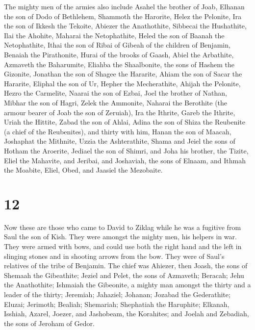  The mighty men of the armies also include Asahel the
brother of Joab, Elhanan the son of Dodo of Bethlehem, 
Shammoth the Harorite, Helez the Pelonite,  Ira the son
of Ikkesh the Tekoite, Abiezer the Anathothite,  Sibbecai
the Hushathite, Ilai the Ahohite,  Maharai the
Netophathite, Heled the son of Baanah the Netophathite, 
Ithai the son of Ribai of Gibeah of the children of Benjamin, Benaiah
the Pirathonite,  Hurai of the brooks of Gaash, Abiel the
Arbathite,  Azmaveth the Baharumite, Eliahba the
Shaalbonite,  the sons of Hashem the Gizonite, Jonathan
the son of Shagee the Hararite,  Ahiam the son of Sacar
the Hararite, Eliphal the son of Ur,  Hepher the
Mecherathite, Ahijah the Pelonite,  Hezro the Carmelite,
Naarai the son of Ezbai,  Joel the brother of Nathan,
Mibhar the son of Hagri,  Zelek the Ammonite, Naharai the
Berothite (the armour bearer of Joab the son of Zeruiah),
 Ira the Ithrite, Gareb the Ithrite, 
Uriah the Hittite, Zabad the son of Ahlai,  Adina the son
of Shiza the Reubenite (a chief of the Reubenites), and thirty with him,
 Hanan the son of Maacah, Joshaphat the Mithnite,
 Uzzia the Ashterathite, Shama and Jeiel the sons of
Hotham the Aroerite,  Jediael the son of Shimri, and Joha
his brother, the Tizite,  Eliel the Mahavite, and
Jeribai, and Joshaviah, the sons of Elnaam, and Ithmah the Moabite,
 Eliel, Obed, and Jaasiel the Mezobaite.

\hypertarget{section-11}{%
\section{12}\label{section-11}}

 Now these are those who came to David to Ziklag while he
was a fugitive from Saul the son of Kish. They were amongst the mighty
men, his helpers in war.  They were armed with bows, and
could use both the right hand and the left in slinging stones and in
shooting arrows from the bow. They were of Saul's relatives of the tribe
of Benjamin.  The chief was Ahiezer, then Joash, the sons
of Shemaah the Gibeathite; Jeziel and Pelet, the sons of Azmaveth;
Beracah; Jehu the Anathothite;  Ishmaiah the Gibeonite, a
mighty man amongst the thirty and a leader of the thirty; Jeremiah;
Jahaziel; Johanan; Jozabad the Gederathite;  Eluzai;
Jerimoth; Bealiah; Shemariah; Shephatiah the Haruphite; 
Elkanah, Isshiah, Azarel, Joezer, and Jashobeam, the Korahites;
 and Joelah and Zebadiah, the sons of Jeroham of Gedor.

